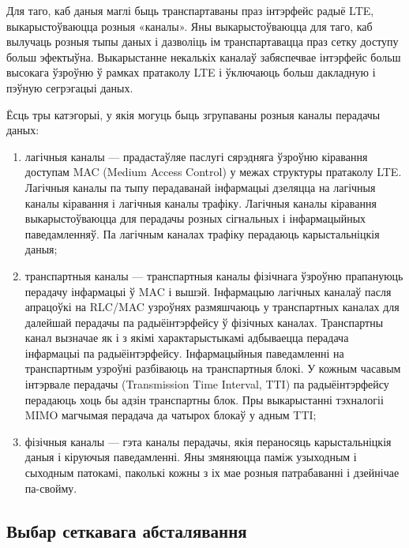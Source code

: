Для таго, каб даныя маглі быць транспартаваны праз інтэрфейс радыё LTE, выкарыстоўваюцца розныя «каналы». Яны выкарыстоўваюцца для таго, каб вылучаць розныя тыпы даных і дазволіць ім транспартавацца праз сетку доступу больш эфектыўна. Выкарыстанне некалькіх каналаў забяспечвае інтэрфейс больш высокага ўзроўню ў рамках пратаколу LTE і ўключаюць больш дакладную і пэўную сегрэгацыі даных.

Ёсць тры катэгорыі, у якія могуць быць згрупаваны розныя каналы перадачы даных:
\begin{enumerate}
    \item лагічныя каналы --- прадастаўляе паслугі сярэдняга ўзроўню кіравання доступам MAC (Medium Access Control) у межах структуры пратаколу LTE. Лагічныя каналы па тыпу перадаванай інфармацыі дзеляцца на лагічныя каналы кіравання і лагічныя каналы трафіку. Лагічныя каналы кіравання выкарыстоўваюцца для перадачы розных сігнальных і інфармацыйных паведамленняў. Па лагічным каналах трафіку перадаюць карыстальніцкія даныя;
    \item транспартныя каналы --- транспартныя каналы фізічнага ўзроўню прапануюць перадачу інфармацыі ў MAC і вышэй. Інфармацыю лагічных каналаў пасля апрацоўкі на RLC/MAC узроўнях размяшчаюць у транспартных каналах для далейшай перадачы па радыёінтэрфейсу ў фізічных каналах. Транспартны канал вызначае як і з якімі характарыстыкамі адбываецца перадача інфармацыі па радыёінтэрфейсу. Інфармацыйныя паведамленні на транспартным узроўні разбіваюць на транспартныя блокі. У кожным часавым інтэрвале перадачы (Transmission Time Interval, TTI) па радыёінтэрфейсу перадаюць хоць бы адзін транспартны блок. Пры выкарыстанні тэхналогіі MIMO магчымая перадача да чатырох блокаў у адным TTI;
    \item фізічныя каналы --- гэта каналы перадачы, якія пераносяць карыстальніцкія даныя і кіруючыя паведамленні. Яны змяняюцца паміж узыходным і сыходным патокамі, паколькі кожны з іх мае розныя патрабаванні і дзейнічае па-свойму.
\end{enumerate}

\subsection{Выбар сеткавага абсталявання}
